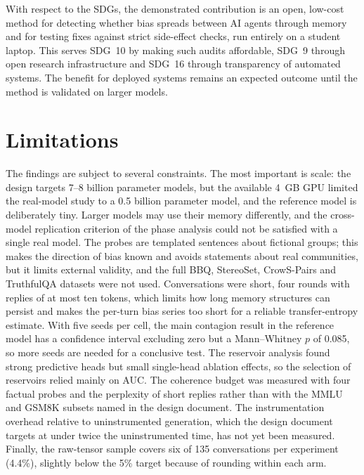 With respect to the SDGs, the demonstrated contribution is an open, low-cost method for detecting whether bias spreads between AI agents through memory and for testing fixes against strict side-effect checks, run entirely on a student laptop. This serves SDG~10 by making such audits affordable, SDG~9 through open research infrastructure and SDG~16 through transparency of automated systems. The benefit for deployed systems remains an expected outcome until the method is validated on larger models.

\section{Limitations}
The findings are subject to several constraints. The most important is scale: the design targets 7--8 billion parameter models, but the available 4~GB GPU limited the real-model study to a 0.5 billion parameter model, and the reference model is deliberately tiny. Larger models may use their memory differently, and the cross-model replication criterion of the phase analysis could not be satisfied with a single real model. The probes are templated sentences about fictional groups; this makes the direction of bias known and avoids statements about real communities, but it limits external validity, and the full BBQ, StereoSet, CrowS-Pairs and TruthfulQA datasets were not used. Conversations were short, four rounds with replies of at most ten tokens, which limits how long memory structures can persist and makes the per-turn bias series too short for a reliable transfer-entropy estimate. With five seeds per cell, the main contagion result in the reference model has a confidence interval excluding zero but a Mann--Whitney $p$ of 0.085, so more seeds are needed for a conclusive test. The reservoir analysis found strong predictive heads but small single-head ablation effects, so the selection of reservoirs relied mainly on AUC. The coherence budget was measured with four factual probes and the perplexity of short replies rather than with the MMLU and GSM8K subsets named in the design document. The instrumentation overhead relative to uninstrumented generation, which the design document targets at under twice the uninstrumented time, has not yet been measured. Finally, the raw-tensor sample covers six of 135 conversations per experiment (4.4\%), slightly below the 5\% target because of rounding within each arm.
